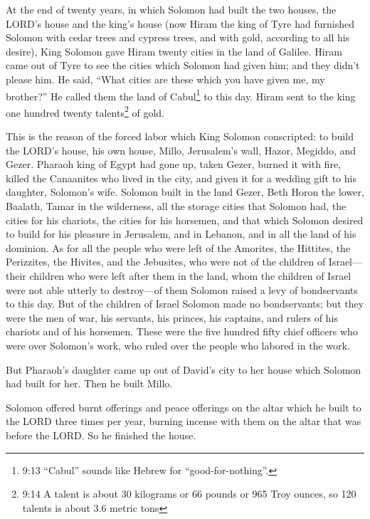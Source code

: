 \myverse{}At the end of twenty years, in which Solomon had built the two
houses, the LORD’s house and the king’s house
\myverse{}(now Hiram the king of Tyre had furnished Solomon with cedar trees and cypress
trees, and with gold, according to all his desire), King Solomon gave Hiram twenty cities in the land
of Galilee.
\myverse{}Hiram came out of Tyre to see the cities which Solomon had given him; and
they didn’t please him.
\myverse{}He said, “What cities are these which you have given me, my brother?” He called
them the land of Cabul\footnote{9:13 “Cabul” sounds like Hebrew for “good-for-nothing”.} to this day.
\myverse{}Hiram sent to the king one hundred twenty talents\footnote{9:14 A talent is about 30 kilograms or 66 pounds or 965 Troy ounces, so 120 talents is about 3.6 metric
	tons} of gold.

\myverse{}This is the reason of the forced labor which King Solomon conscripted:
to build the LORD’s house, his own house, Millo, Jerusalem’s wall, Hazor, Megiddo, and Gezer.
\myverse{}Pharaoh king of Egypt had gone up, taken Gezer, burned it with fire, killed
the Canaanites who lived in the city, and given it for a wedding gift to his daughter, Solomon’s wife.
\myverse{}Solomon built in the land Gezer, Beth Horon the lower,
\myverse{}Baalath, Tamar in the wilderness,
\myverse{}all the storage cities that Solomon had, the cities for his chariots, the
cities for his horsemen, and that which Solomon desired to build for his pleasure in Jerusalem, and in
Lebanon, and in all the land of his dominion.
\myverse{}As for all the people who were left of the Amorites, the Hittites, the Perizzites,
the Hivites, and the Jebusites, who were not of the children of Israel—
\myverse{}their children who were left after them in the land, whom the children of
Israel were not able utterly to destroy—of them Solomon raised a levy of bondservants to this day.
\myverse{}But of the children of Israel Solomon made no bondservants; but they were
the men of war, his servants, his princes, his captains, and rulers of his chariots and of his horsemen.
\myverse{}These were the five hundred fifty chief officers who were over Solomon’s work,
who ruled over the people who labored in the work.

\myverse{}But Pharaoh’s daughter came up out of David’s city to her house
which Solomon had built for her. Then he built Millo.

\myverse{}Solomon offered burnt offerings and peace offerings on the altar
which he built to the LORD three times per year, burning incense with them on the altar that was before
the LORD. So he finished the house.

